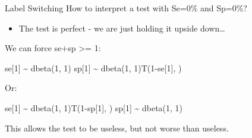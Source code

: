 \documentclass[
  ignorenonframetext,
  aspectratio=169,
]{beamer}
\newenvironment{Shaded}{\begin{snugshade}}{\end{snugshade}}
\newcommand{\DecValTok}[1]{\textcolor[rgb]{0.00,0.00,0.81}{#1}}
\newcommand{\FunctionTok}[1]{\textcolor[rgb]{0.00,0.00,0.00}{#1}}
\newcommand{\NormalTok}[1]{#1}
\newcommand{\SpecialCharTok}[1]{\textcolor[rgb]{0.00,0.00,0.00}{#1}}
\providecommand{\tightlist}{%
  \setlength{\itemsep}{0pt}\setlength{\parskip}{0pt}}
\begin{document}
\begin{frame}[fragile]{Label Switching}
\protect\hypertarget{label-switching}{}
How to interpret a test with Se=0\% and Sp=0\%?

\pause

\begin{itemize}
\tightlist
\item
  The test is perfect - we are just holding it upside down\ldots{}
\end{itemize}

\pause

We can force se+sp \textgreater= 1:

\scriptsize

\begin{Shaded}
\begin{Highlighting}[]
\NormalTok{  se[}\DecValTok{1}\NormalTok{] }\SpecialCharTok{\textasciitilde{}} \FunctionTok{dbeta}\NormalTok{(}\DecValTok{1}\NormalTok{, }\DecValTok{1}\NormalTok{)}
\NormalTok{  sp[}\DecValTok{1}\NormalTok{] }\SpecialCharTok{\textasciitilde{}} \FunctionTok{dbeta}\NormalTok{(}\DecValTok{1}\NormalTok{, }\DecValTok{1}\NormalTok{)}\FunctionTok{T}\NormalTok{(}\DecValTok{1}\SpecialCharTok{{-}}\NormalTok{se[}\DecValTok{1}\NormalTok{], )}
\end{Highlighting}
\end{Shaded}

\normalsize

Or:

\scriptsize

\begin{Shaded}
\begin{Highlighting}[]
\NormalTok{  se[}\DecValTok{1}\NormalTok{] }\SpecialCharTok{\textasciitilde{}} \FunctionTok{dbeta}\NormalTok{(}\DecValTok{1}\NormalTok{, }\DecValTok{1}\NormalTok{)}\FunctionTok{T}\NormalTok{(}\DecValTok{1}\SpecialCharTok{{-}}\NormalTok{sp[}\DecValTok{1}\NormalTok{], )}
\NormalTok{  sp[}\DecValTok{1}\NormalTok{] }\SpecialCharTok{\textasciitilde{}} \FunctionTok{dbeta}\NormalTok{(}\DecValTok{1}\NormalTok{, }\DecValTok{1}\NormalTok{)}
\end{Highlighting}
\end{Shaded}

\normalsize

This allows the test to be useless, but not worse than useless.
\end{frame}
\end{document}
